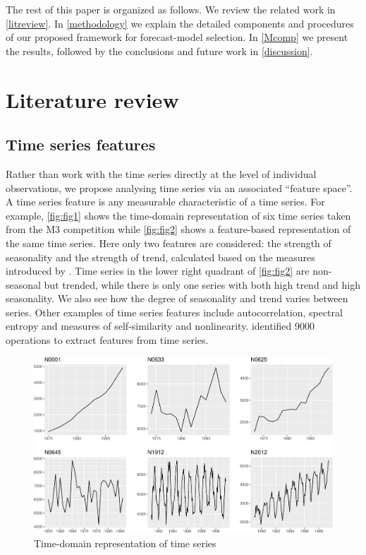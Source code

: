 \documentclass[11pt,a4paper,]{article}
\theoremstyle{definition}
\theoremstyle{definition}
\theoremstyle{definition}
\theoremstyle{remark}
\begin{document}
The rest of this paper is organized as follows. We review the related
work in \autoref{litreview}. In \autoref{methodology} we explain the
detailed components and procedures of our proposed framework for
forecast-model selection. In \autoref{Mcomp} we present the results,
followed by the conclusions and future work in \autoref{discussion}.

\hypertarget{litreview}{%
\section{Literature review}\label{litreview}}

\hypertarget{time-series-features}{%
\subsection{Time series features}\label{time-series-features}}

Rather than work with the time series directly at the level of
individual observations, we propose analysing time series via an
associated ``feature space''. A time series feature is any measurable
characteristic of a time series. For example, \autoref{fig:fig1} shows
the time-domain representation of six time series taken from the M3
competition \autocite{makridakis2000m3} while \autoref{fig:fig2} shows a
feature-based representation of the same time series. Here only two
features are considered: the strength of seasonality and the strength of
trend, calculated based on the measures introduced by
\textcite{wang2009rule}. Time series in the lower right quadrant of
\autoref{fig:fig2} are non-seasonal but trended, while there is only one
series with both high trend and high seasonality. We also see how the
degree of seasonality and trend varies between series. Other examples of
time series features include autocorrelation, spectral entropy and
measures of self-similarity and nonlinearity.
\textcite{fulcher2014highly} identified 9000 operations to extract
features from time series.

\begin{figure}

{\centering \includegraphics[width=\textwidth]{figure/fig1-1} 

}

\caption{Time-domain representation of time series}\label{fig:fig1}
\end{figure}
\end{document}
